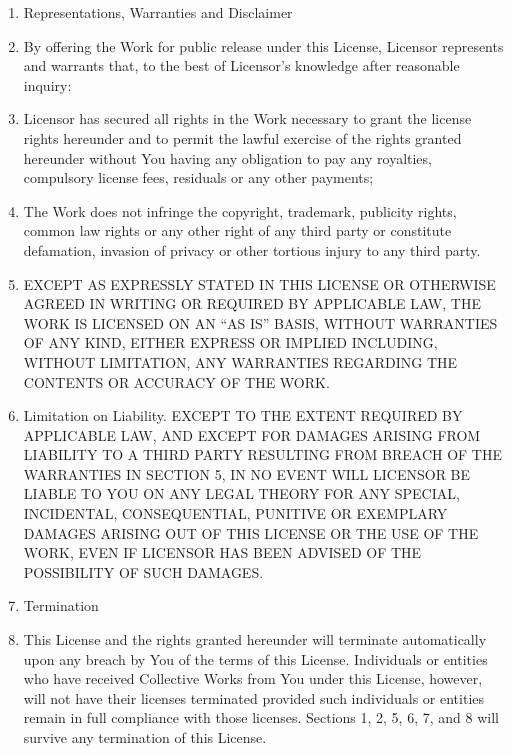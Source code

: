 \begin{enumerate}[1.]
\item
  Representations, Warranties and Disclaimer

\item
  By offering the Work for public release under this License,
  Licensor represents and warrants that, to the best of Licensor's
  knowledge after reasonable inquiry:

\item
  Licensor has secured all rights in the Work necessary to grant the
  license rights hereunder and to permit the lawful exercise of the
  rights granted hereunder without You having any obligation to pay
  any royalties, compulsory license fees, residuals or any other
  payments;

\item
  The Work does not infringe the copyright, trademark, publicity
  rights, common law rights or any other right of any third party or
  constitute defamation, invasion of privacy or other tortious injury
  to any third party.

\item
  EXCEPT AS EXPRESSLY STATED IN THIS LICENSE OR OTHERWISE AGREED IN
  WRITING OR REQUIRED BY APPLICABLE LAW, THE WORK IS LICENSED ON AN
  ``AS IS'' BASIS, WITHOUT WARRANTIES OF ANY KIND, EITHER EXPRESS OR
  IMPLIED INCLUDING, WITHOUT LIMITATION, ANY WARRANTIES REGARDING THE
  CONTENTS OR ACCURACY OF THE WORK.

\item
  Limitation on Liability. EXCEPT TO THE EXTENT REQUIRED BY
  APPLICABLE LAW, AND EXCEPT FOR DAMAGES ARISING FROM LIABILITY TO A
  THIRD PARTY RESULTING FROM BREACH OF THE WARRANTIES IN SECTION 5,
  IN NO EVENT WILL LICENSOR BE LIABLE TO YOU ON ANY LEGAL THEORY FOR
  ANY SPECIAL, INCIDENTAL, CONSEQUENTIAL, PUNITIVE OR EXEMPLARY
  DAMAGES ARISING OUT OF THIS LICENSE OR THE USE OF THE WORK, EVEN IF
  LICENSOR HAS BEEN ADVISED OF THE POSSIBILITY OF SUCH DAMAGES.

\item
  Termination

\item
  This License and the rights granted hereunder will terminate
  automatically upon any breach by You of the terms of this License.
  Individuals or entities who have received Collective Works from You
  under this License, however, will not have their licenses
  terminated provided such individuals or entities remain in full
  compliance with those licenses. Sections 1, 2, 5, 6, 7, and 8 will
  survive any termination of this License.


\end{enumerate}
